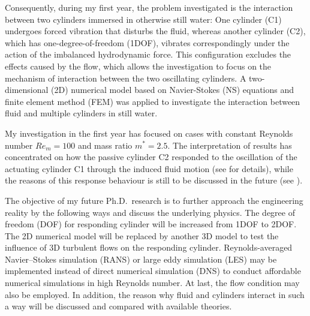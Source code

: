Consequently, during my first year, the problem investigated is the interaction between two cylinders immersed in otherwise still water: One cylinder (C1) undergoes forced vibration that disturbs the fluid, whereas another cylinder (C2), which has one-degree-of-freedom (1DOF), vibrates correspondingly under the action of the imbalanced hydrodynamic force. This configuration excludes the effects caused by the flow, which allows the investigation to focus on the mechanism of interaction between the two oscillating cylinders. A two-dimensional (2D) numerical model based on Navier-Stokes (NS) equations and finite element method (FEM) was applied to investigate the interaction between fluid and multiple cylinders in still water. 

My investigation in the first year has focused on cases with constant Reynolds number $ Re_m =100 $ and mass ratio $ m^* =2.5$. The interpretation of results has concentrated on how the passive cylinder C2 responded to the oscillation of the actuating cylinder C1 through the induced fluid motion (see  for details), while the reasons of this response behaviour is still to be discussed in the future (see ).

The objective of my future Ph.D.\ research is to further approach the engineering reality by the following ways and discuss the underlying physics. The degree of freedom (DOF) for responding cylinder will be increased from 1DOF to 2DOF. The 2D numerical model will be replaced by another 3D model to test the influence of 3D turbulent flows on the responding cylinder. Reynolds-averaged Navier–Stokes simulation (RANS) or large eddy simulation (LES) may be implemented instead of direct numerical simulation (DNS) to conduct affordable numerical simulations in high Reynolds number. At last, the flow condition may also be employed. In addition, the reason why fluid and cylinders interact in such a way will be discussed and compared with available theories. 




